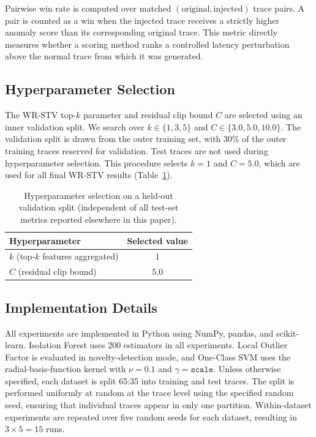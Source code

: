 \documentclass[informatics,article,submit,moreauthors]{Definitions/mdpi}
\begin{document}
Pairwise win rate is computed over matched
\((\text{original}, \text{injected})\) trace pairs. A pair is counted as a
win when the injected trace receives a strictly higher anomaly score than
its corresponding original trace. This metric directly measures whether
a scoring method ranks a controlled latency perturbation above the normal
trace from which it was generated.

\subsection{Hyperparameter Selection}
\label{sec:hyperparameter-selection}

The WR-STV top-\(k\) parameter and residual clip bound \(C\) are selected
using an inner validation split. We search over
\(k \in \{1,3,5\}\) and \(C \in \{3.0,5.0,10.0\}\). The validation split
is drawn from the outer training set, with \(30\%\) of the outer training
traces reserved for validation. Test traces are not used during
hyperparameter selection. This procedure selects \(k=1\) and \(C=5.0\),
which are used for all final WR-STV results
(Table~\ref{tab:hyperparam-validation}).

\begin{table}[t]
	\centering
	\caption{Hyperparameter selection on a held-out validation split
		(independent of all test-set metrics reported elsewhere in this paper).}
	\label{tab:hyperparam-validation}
	\begin{tabular}{lc}
		\toprule
		\textbf{Hyperparameter} & \textbf{Selected value} \\
		\midrule
		$k$ (top-$k$ features aggregated) & 1 \\
		$C$ (residual clip bound)         & 5.0 \\
		\bottomrule
	\end{tabular}

	\vspace{4pt}
	\footnotesize
\end{table}


\subsection{Implementation Details}

All experiments are implemented in Python using NumPy, pandas, and
scikit-learn. Isolation Forest uses 200 estimators in all experiments.
Local Outlier Factor is evaluated in novelty-detection mode, and
One-Class SVM uses the radial-basis-function kernel with
\(\nu=0.1\) and \(\gamma=\texttt{scale}\). Unless otherwise specified,
each dataset is split 65:35 into training and test traces. The split is performed uniformly at random at the trace level using the specified random seed, ensuring that individual traces appear in only one partition. Within-dataset
experiments are repeated over five random seeds for each dataset,
resulting in \(3 \times 5 = 15\) runs.
\end{document}
